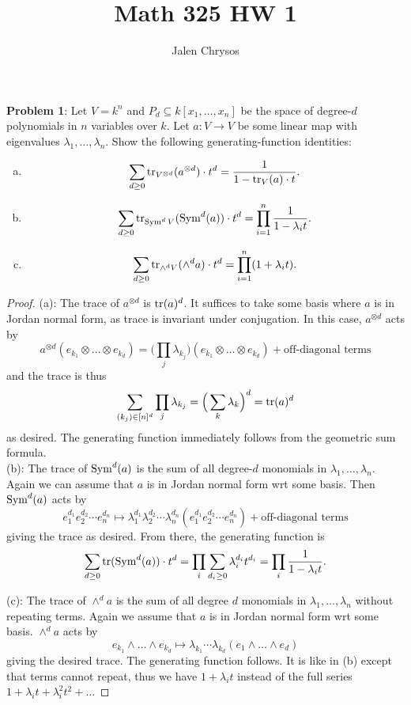\documentclass{amsart}
\title{Math 325 HW 1}
\author{Jalen Chrysos}
\begin{document}
	
	\maketitle
	
\noindent \textbf{Problem 1}:  Let $V=k^n$ and $P_d\subseteq k[x_1,\dots,x_n]$ be the space of degree-$d$ polynomials in $n$ variables over $k$. Let $a:V\to V$ be some linear map with eigenvalues $\lambda_1,\dots,\lambda_n$. Show the following generating-function identities:
\begin{enumerate}[(a)]
	\item $$\sum_{d\geq 0} \operatorname{tr}_{V^{\otimes d}}(a^{\otimes d})\cdot t^d = \frac{1}{1-\operatorname{tr}_V(a)\cdot t}.$$
	\item $$\sum_{d\geq 0} \operatorname{tr}_{\operatorname{Sym}^dV}(\operatorname{Sym}^d(a)) \cdot t^d = \prod_{i=1}^n \frac{1}{1-\lambda_it}.$$
	\item $$\sum_{d\geq 0} \operatorname{tr}_{\wedge^dV}(\wedge^d a)\cdot t^d = \prod_{i=1}^n (1+\lambda_i t).$$
\end{enumerate}
	\begin{proof}
		(a): The trace of $a^{\otimes d}$ is $\operatorname{tr}(a)^d$. It suffices to take some basis where $a$ is in Jordan normal form, as trace is invariant under conjugation. In this case, $a^{\otimes d}$ acts by
		$$a^{\otimes d}(e_{k_1}\otimes \dots \otimes e_{k_d}) = \Big(\prod_j \lambda_{k_j}\Big) (e_{k_1}\otimes \dots \otimes e_{k_d}) + \text{off-diagonal terms}$$
		and the trace is thus
		$$
		\sum_{(k_j)\in [n]^d} \prod_j \lambda_{k_j} = \Big(\sum_k \lambda_k\Big)^d = \operatorname{tr}(a)^d
		$$
		as desired. The generating function immediately follows from the geometric sum formula.\\
		
		(b): The trace of $\operatorname{Sym}^d(a)$ is the sum of all degree-$d$ monomials in $\lambda_1,\dots,\lambda_n$. Again we can assume that $a$ is in Jordan normal form wrt some basis. Then $\operatorname{Sym}^d(a)$ acts by
		$$
		e_1^{d_1}e_2^{d_2}\cdots e_n^{d_n} \mapsto \lambda_1^{d_1}\lambda_2^{d_2}\cdots \lambda_n^{d_n} (e_1^{d_1}e_2^{d_2}\cdots e_n^{d_n}) + \text{off-diagonal terms}
		$$
		giving the trace as desired. From there, the generating function is
		$$
		\sum_{d\geq 0} \operatorname{tr}(\operatorname{Sym}^d(a))\cdot t^d = \prod_i \sum_{d_i \geq 0} \lambda_i^{d_i} t^{d_i} = \prod_i \frac{1}{1-\lambda_i t}.
		$$
		
		(c): The trace of $\wedge^d a$ is the sum of all degree $d$ monomials in $\lambda_1,\dots,\lambda_n$ without repeating terms. Again we assume that $a$ is in Jordan normal form wrt some basis. $\wedge^d a$ acts by
		$$
		e_{k_1}\wedge \dots \wedge e_{k_d} \mapsto \lambda_{k_1}\cdots\lambda_{k_d} (e_1\wedge \dots \wedge e_d)
		$$
		giving the desired trace. The generating function follows. It is like in (b) except that terms cannot repeat, thus we have $1+\lambda_i t$ instead of the full series $1+\lambda_it+\lambda_i^2t^2+\dots$
	\end{proof}
	
\end{document}
